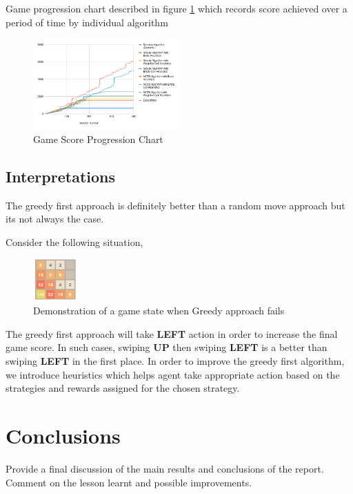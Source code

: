\documentclass{svproc}
\begin{document}
    Game progression chart described in figure \ref{game_score_progression_chart} which records score achieved over a period of time by individual algorithm

    \begin{figure}[h!]

        \centering
        \includegraphics[width=0.5\textwidth]{Game Score Progression Chart.png}
        \caption{Game Score Progression Chart}
        \label{game_score_progression_chart}
    \end{figure}


    \subsection{Interpretations}

    The greedy first approach is definitely better than a random move approach but its not always the case.

    Consider the following situation,
    \begin{figure}[h!]

        \centering
        \includegraphics[width=0.15\textwidth]{greedy_img_correction.png}
        \caption{Demonstration of a game state when Greedy approach fails}
    \end{figure}

    The greedy first approach will take \textbf{LEFT} action in order to increase the final game score. In such cases, swiping \textbf{UP} then swiping \textbf{LEFT} is a better than swiping \textbf{LEFT} in the first place. In order to improve the greedy first algorithm, we introduce heuristics which helps agent take appropriate action based on the strategies and rewards assigned for the chosen strategy.


    \section{Conclusions}
    Provide a final discussion of the main results and conclusions of the report. Comment on the lesson learnt and possible improvements.



    
    
\end{document}
